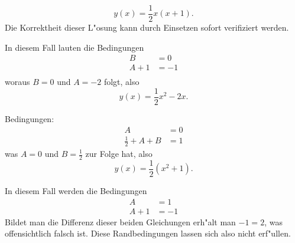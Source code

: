 \begin{loesung}
\begin{teilaufgaben}
\[
y(x)=\frac12x(x+1).
\]
Die Korrektheit dieser L"osung kann durch Einsetzen sofort
verifiziert werden.
\item In diesem Fall lauten die Bedingungen
\begin{align*}
B&=0\\
A+1&=-1\\
\end{align*}
woraus $B=0$ und $A=-2$ folgt, also
\[
y(x)=\frac12x^2-2x.
\]
\item
Bedingungen:
\begin{align*}
A&=0\\
\frac12+A+B&=1
\end{align*}
was $A=0$ und $B=\frac12$ zur Folge hat, also
\[
y(x)=\frac12(x^2+1).
\]
\item In diesem Fall werden die Bedingungen
\begin{align*}
A&=1\\
A+1&=-1
\end{align*}
Bildet man die Differenz dieser beiden Gleichungen
erh"alt man $-1=2$, was offensichtlich falsch ist. Diese
Randbedingungen lassen sich also nicht erf"ullen.
\qedhere
\end{teilaufgaben}
\end{loesung}
